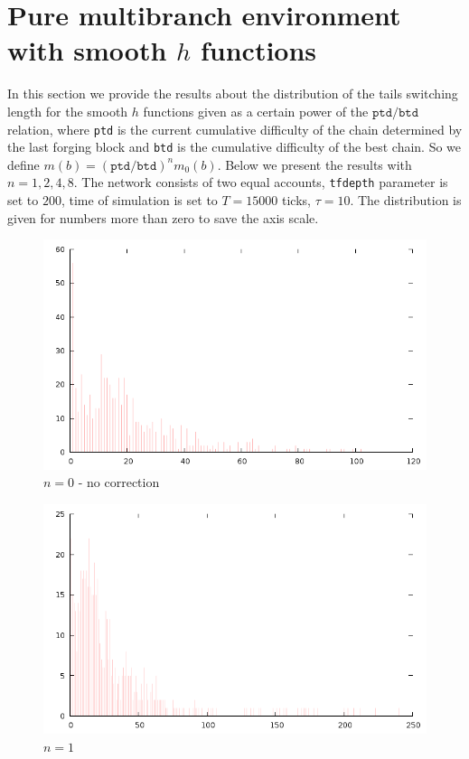 \documentclass[12pt]{article}
\begin{document}
\section{Pure multibranch environment with smooth $h$ functions}

In this section we provide the results about the distribution of the tails switching length for the smooth $h$ functions given 
as a certain power of the $\texttt{ptd}/\texttt{btd}$ relation, where \texttt{ptd} is the current cumulative difficulty of the
chain determined by the last forging block and \texttt{btd} is the cumulative difficulty of the best chain. So we define
$m(b) = (\texttt{ptd}/\texttt{btd})^n m_0(b)$. Below we present the results with $n=1,2,4,8$. The network consists of
two equal accounts, \texttt{tfdepth} parameter is set to $200$, time of simulation is set to $T=15000$ ticks, $\tau=10$.
The distribution is given for numbers more than zero to save the axis scale.

\begin{figure}[H]
\centering
\caption{$n=0$ \-- no correction}
\includegraphics[scale=0.6]{changes-n0k1.png}
\end{figure} 

\begin{figure}[H]
\centering
\caption{$n=1$}
\includegraphics[scale=0.6]{changes-n1k1.png}
\end{figure} 
\end{document}
